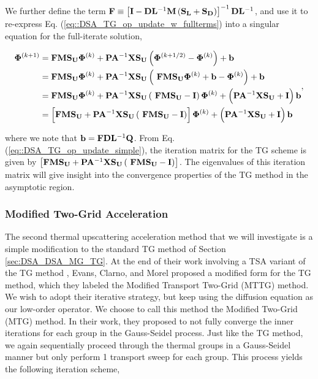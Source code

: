 \noindent We further define the term ${\bf F} \equiv \left[ {\bf I} - {\bf D}{\bf L}^{-1} {\bf M} \left(  {\bf S_L} + {\bf S_D} \right) \right]^{-1} {\bf D}{\bf L}^{-1}$, and use it to re-express Eq. (\ref{eq::DSA_TG_op_update_w_fullterms}) into a singular equation for the full-iterate solution,

\begin{equation}
\label{eq::DSA_TG_op_update_simple}
\begin{aligned}
 {\bf \Phi}^{(k+1)} &=  {\bf F}  {\bf M} {\bf S_U} {\bf \Phi}^{(k)} +  {\bf P} {\bf A}^{-1}  {\bf X} {\bf S_{U}} \left(  {\bf \Phi}^{(k+1/2)} - {\bf \Phi}^{(k)}  \right) + {\bf b} \\
&= {\bf F}  {\bf M} {\bf S_U} {\bf \Phi}^{(k)} +  {\bf P} {\bf A}^{-1}  {\bf X} {\bf S_{U}} \left(  \ {\bf F}  {\bf M} {\bf S_U} {\bf \Phi}^{(k)} + {\bf b} - {\bf \Phi}^{(k)}  \right) + {\bf b} \\
&= {\bf F}  {\bf M} {\bf S_U} {\bf \Phi}^{(k)} +  {\bf P} {\bf A}^{-1}  {\bf X} {\bf S_{U}} \left(  \ {\bf F}  {\bf M} {\bf S_U}  -  {\bf I} \right){\bf \Phi}^{(k)} + \left(  {\bf P} {\bf A}^{-1}  {\bf X} {\bf S_{U}}  + {\bf I} \right) {\bf b} \\
&= \left[ {\bf F}  {\bf M} {\bf S_U} +  {\bf P} {\bf A}^{-1}  {\bf X} {\bf S_{U}} \left(  \ {\bf F}  {\bf M} {\bf S_U}  -  {\bf I} \right) \right] {\bf \Phi}^{(k)} + \left(  {\bf P} {\bf A}^{-1}  {\bf X} {\bf S_{U}}  + {\bf I} \right) {\bf b}
\end{aligned} ,
\end{equation}

\noindent where we note that ${\bf b}={\bf F} {\bf D}{\bf L}^{-1}  {\bf Q}$. From Eq. (\ref{eq::DSA_TG_op_update_simple}), the iteration matrix for the TG scheme is given by $\left[ {\bf F}  {\bf M} {\bf S_U} +  {\bf P} {\bf A}^{-1}  {\bf X} {\bf S_{U}} \left(  \ {\bf F}  {\bf M} {\bf S_U}  -  {\bf I} \right) \right]$. The eigenvalues of this iteration matrix will give insight into the convergence properties of the TG method in the asymptotic region.


\subsubsection{Modified Two-Grid Acceleration}
\label{sec:DSA_DSA_MG_MTG}

The second thermal upscattering acceleration method that we will investigate is a simple modification to the standard TG method of Section \ref{sec:DSA_DSA_MG_TG}. At the end of their work involving a TSA variant of the TG method \cite{evans2010transport}, Evans, Clarno, and Morel proposed a modified form for the TG method, which they labeled the Modified Transport Two-Grid (MTTG) method. We wish to adopt their iterative strategy, but keep using the diffusion equation as our low-order operator. We choose to call this method the Modified Two-Grid (MTG) method. In their work, they proposed to not fully converge the inner iterations for each group in the Gauss-Seidel process. Just like the TG method, we again sequentially proceed through the thermal groups in a Gauss-Seidel manner but only perform 1 transport sweep for each group. This process yields the following iteration scheme,

